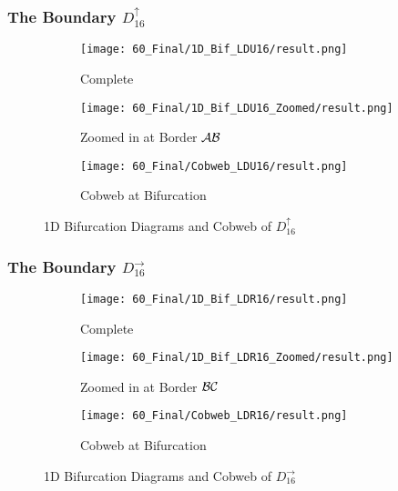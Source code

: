 \subsubsection{The Boundary $D_{16}^\uparrow$}

\begin{figure}
    \centering
    \begin{subfigure}{0.3\textwidth}
        \centering
        \texttt{[image: 60\_Final/1D\_Bif\_LDU16/result.png]}
        \caption{Complete}
        \label{fig:final.bifurcation.D.up}
    \end{subfigure}
    \begin{subfigure}{0.3\textwidth}
        \centering
        \texttt{[image: 60\_Final/1D\_Bif\_LDU16\_Zoomed/result.png]}
        \caption{Zoomed in at Border $\mathcal{A}\mathcal{B}$}
        \label{fig:final.bifurcation.D.up.zoomed}
    \end{subfigure}
    \begin{subfigure}{0.3\textwidth}
        \centering
        \texttt{[image: 60\_Final/Cobweb\_LDU16/result.png]}
        \caption{Cobweb at Bifurcation}
        \label{fig:final.bifurcation.D.up.cobweb}
    \end{subfigure}
    \caption{1D Bifurcation Diagrams and Cobweb of $D_{16}^\uparrow$}
\end{figure}

\subsubsection{The Boundary $D_{16}^\rightarrow$}

\begin{figure}
    \centering
    \begin{subfigure}{0.3\textwidth}
        \centering
        \texttt{[image: 60\_Final/1D\_Bif\_LDR16/result.png]}
        \caption{Complete}
        \label{fig:final.bifurcation.D.right}
    \end{subfigure}
    \begin{subfigure}{0.3\textwidth}
        \centering
        \texttt{[image: 60\_Final/1D\_Bif\_LDR16\_Zoomed/result.png]}
        \caption{Zoomed in at Border $\mathcal{B}\mathcal{C}$}
        \label{fig:final.bifurcation.D.right.zoomed}
    \end{subfigure}
    \begin{subfigure}{0.3\textwidth}
        \centering
        \texttt{[image: 60\_Final/Cobweb\_LDR16/result.png]}
        \caption{Cobweb at Bifurcation}
        \label{fig:final.bifurcation.D.right.cobweb}
    \end{subfigure}
    \caption{1D Bifurcation Diagrams and Cobweb of $D_{16}^\rightarrow$}
\end{figure}

